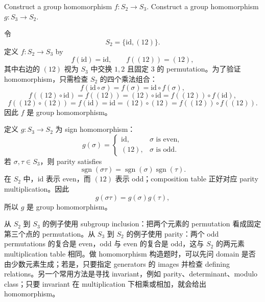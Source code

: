 \begin{exerciseblock}
Construct a group homomorphism \(f:S_2\to S_3\). Construct a group homomorphism \(g:S_3\to S_2\).
\end{exerciseblock}

\begin{solution}
令
\[
  S_2=\{\mathrm{id},(12)\}.
\]
定义 \(f:S_2\to S_3\) by
\[
  f(\mathrm{id})=\mathrm{id},\qquad f((12))=(12),
\]
其中右边的 \((12)\) 视为 \(S_3\) 中交换 \(1,2\) 且固定 \(3\) 的 permutation。为了验证 homomorphism，只需检查 \(S_2\) 的四个乘法组合：
\[
  f(\mathrm{id}\circ\sigma)=f(\sigma)=\mathrm{id}\circ f(\sigma),
\]
\[
  f((12)\circ\mathrm{id})=f((12))=(12)\circ\mathrm{id}=f((12))\circ f(\mathrm{id}),
\]
\[
  f((12)\circ(12))=f(\mathrm{id})=\mathrm{id}=(12)\circ(12)=f((12))\circ f((12)).
\]
因此 \(f\) 是 group homomorphism。

定义 \(g:S_3\to S_2\) 为 sign homomorphism：
\[
  g(\sigma)=
  \begin{cases}
    \mathrm{id}, & \sigma\text{ is even},\\
    (12), & \sigma\text{ is odd}.
  \end{cases}
\]
若 \(\sigma,\tau\in S_3\)，则 parity satisfies
\[
  \operatorname{sgn}(\sigma\tau)=\operatorname{sgn}(\sigma)\operatorname{sgn}(\tau).
\]
在 \(S_2\) 中，\(\mathrm{id}\) 表示 even，而 \((12)\) 表示 odd；composition table 正好对应 parity multiplication。因此
\[
  g(\sigma\tau)=g(\sigma)g(\tau),
\]
所以 \(g\) 是 group homomorphism。
\end{solution}

\begin{explanation}
从 \(S_2\) 到 \(S_3\) 的例子使用 subgroup inclusion：把两个元素的 permutation 看成固定第三个点的 permutation。从 \(S_3\) 到 \(S_2\) 的例子使用 parity：两个 odd permutations 的复合是 even，odd 与 even 的复合是 odd，这与 \(S_2\) 的两元素 multiplication table 相同。做 homomorphism 构造题时，可以先问 domain 是否由少数元素生成；若是，只要指定 generators 的 images 并检查 defining relations。另一个常用方法是寻找 invariant，例如 parity、determinant、modulo class；只要 invariant 在 multiplication 下相乘或相加，就会给出 homomorphism。
\end{explanation}
